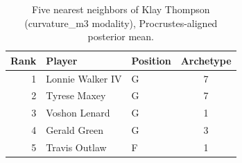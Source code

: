 \begin{table}[htbp]
  \centering\small
  \begin{tabular}{rllc}
    \toprule
    Rank & Player & Position & Archetype \\
    \midrule
    1 & Lonnie Walker IV & G & 7 \\
    2 & Tyrese Maxey & G & 7 \\
    3 & Voshon Lenard & G & 1 \\
    4 & Gerald Green & G & 3 \\
    5 & Travis Outlaw & F & 1 \\
    \bottomrule
  \end{tabular}
  \caption{Five nearest neighbors of Klay Thompson (curvature_m3 modality), Procrustes-aligned posterior mean.}
  \label{tab:Klay_Thompson_neighbors_curvature_m3}
\end{table}

